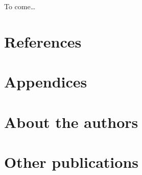 \documentclass[
  letterpaper,
  DIV=11,
  numbers=noendperiod]{scrartcl}
\begin{document}
To come\ldots{}

\section{References}\label{references}

\section*{Appendices}\label{appendices}

\section*{About the authors}\label{about-the-authors}

\section*{Other publications}\label{other-publications}
\end{document}
